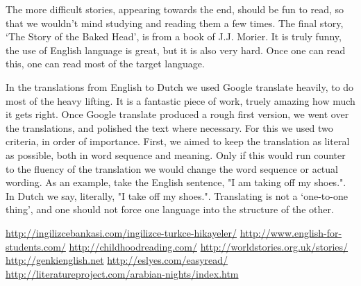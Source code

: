 The more difficult stories, appearing towards the end, should be fun to read, so that we wouldn't mind studying and reading them a few times. The final story, `The Story of the Baked Head',  is from a book of J.J. Morier. It is truly funny, the use of  English language is great, but it is also very hard. Once one can read this, one can read most of the target language. 

In the translations from English to Dutch we used Google translate heavily, to do most of the heavy lifting. It is a fantastic piece of work, truely amazing how much it gets right. Once Google translate produced a rough first version, we went over the translations, and polished the text where necessary. For this we used two criteria, in order of importance. First, we aimed to keep the translation as literal as possible,  both in word sequence and meaning. Only if this would run counter to the fluency of the translation we would change the word sequence or actual wording. As an example, take the English sentence, "I am taking off my shoes.". In Dutch we say, literally, "I take off my shoes.". Translating is not a `one-to-one thing', and one should not force one language into the structure of the other.

\url{http://ingilizcebankasi.com/ingilizce-turkce-hikayeler/}
\url{http://www.english-for-students.com/}
\url{http://childhoodreading.com/}
\url{http://worldstories.org.uk/stories/}
\url{http://genkienglish.net}
\url{http://eslyes.com/easyread/}
\url{http://literatureproject.com/arabian-nights/index.htm}
